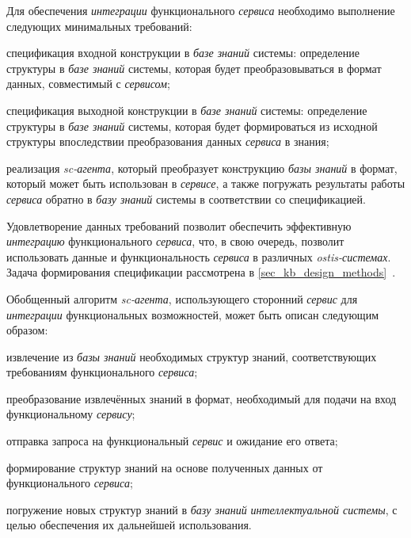 Для обеспечения \textit{интеграции} функционального \textit{сервиса} необходимо выполнение следующих минимальных требований:
\begin{textitemize}
    \item спецификация входной конструкции в \textit{базе знаний} системы: определение структуры в \textit{базе знаний} системы, которая будет преобразовываться в формат данных, совместимый с \textit{сервисом};
    \item спецификация выходной конструкции в \textit{базе знаний} системы: определение структуры в \textit{базе знаний} системы, которая будет формироваться из исходной структуры впоследствии преобразования данных \textit{сервиса} в знания;
    \item реализация \textit{sc-агента}, который преобразует конструкцию \textit{базы знаний} в формат, который может быть использован в \textit{сервисе}, а также погружать результаты работы \textit{сервиса} обратно в \textit{базу знаний} системы в соответствии со спецификацией.
\end{textitemize}

Удовлетворение данных требований позволит обеспечить эффективную \textit{интеграцию} функционального \textit{сервиса}, что, в свою очередь, позволит использовать данные и функциональность \textit{сервиса} в различных \textit{ostis-системах}. Задача формирования спецификации рассмотрена в \ref{sec_kb_design_methods}~.

Обобщенный алгоритм \textit{sc-агента}, использующего сторонний \textit{сервис} для \textit{интеграции} функциональных возможностей, может быть описан следующим образом:

\begin{textitemize}
    \item извлечение из \textit{базы знаний} необходимых структур знаний, соответствующих требованиям функционального \textit{сервиса};
    \item преобразование извлечённых знаний в формат, необходимый для подачи на вход функциональному \textit{сервису};
    \item отправка запроса на функциональный \textit{сервис} и ожидание его ответа;
    \item формирование структур знаний на основе полученных данных от функционального \textit{сервиса};
    \item погружение новых структур знаний в \textit{базу знаний} \textit{интеллектуальной системы}, с целью обеспечения их дальнейшей использования.
\end{textitemize}


